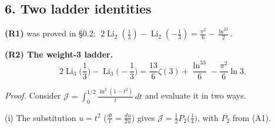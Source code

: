 \documentclass[11pt]{article}
\theoremstyle{remark}
\begin{document}
\subsection*{6. Two ladder identities}

\textbf{(R1)} was proved in \S0.2: $\;2\operatorname{Li}_2(\frac13)-\operatorname{Li}_2(-\frac13)=\frac{\pi^2}{6}-\frac{\ln^23}{2}$.

\textbf{(R2) The weight-3 ladder.}
\begin{equation*}
2\operatorname{Li}_3\!\Big(\frac13\Big)-\operatorname{Li}_3\!\Big(-\frac13\Big)=\frac{13}{6}\zeta(3)+\frac{\ln^33}{6}-\frac{\pi^2}{6}\ln3. \tag{R2}
\end{equation*}

\textit{Proof.} Consider $\mathcal J=\displaystyle\int_0^{1/2}\frac{\ln^2(1-t^2)}{t}\,dt$ and evaluate it in two ways.

(i) The substitution $u=t^2$ ($\frac{dt}{t}=\frac{du}{2u}$) gives $\mathcal J=\frac12P_2\big(\frac14\big)$, with $P_2$ from (A1).
\end{document}
